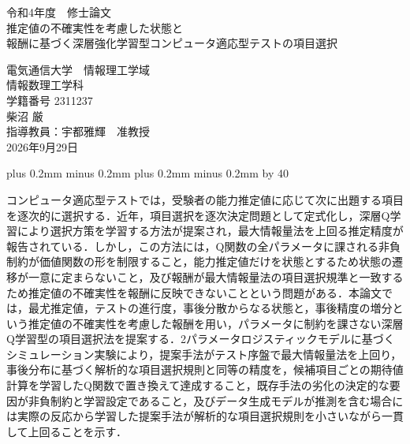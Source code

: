 \documentclass[a4paper,12pt,oneside,openany]{jsbook}
\def\kcharparline#1{%
   \ifx\xkanjiskip\undefined%
   \jintercharskip 0mm plus 0.2mm minus 0.2mm
   \else
   \xkanjiskip 0mm plus 0.2mm minus 0.2mm
   \fi
   \settowidth{\textwidth}{}%
   \multiply\textwidth by #1}
\begin{document}
\begin{titlepage}

\begin{center}
{\Large 令和4年度　修士論文}\\ %
\vspace*{120truept}
{\LARGE 推定値の不確実性を考慮した状態と}\\ %
{\LARGE 報酬に基づく深層強化学習型コンピュータ適応型テストの項目選択}\\ %
\vspace{100truept}

{\LARGE 電気通信大学　情報理工学域}\\ %
\vspace{10truept}
{\LARGE 情報数理工学科}\\ %
\vspace{10truept}
{\LARGE 学籍番号 2311237}\\ %
\vspace{50truept}
{\LARGE 柴沼 厳}\\ %
\vspace{50truept}
{\LARGE 指導教員：宇都雅輝　准教授}\\
\vspace{50truept}
{\LARGE 2026年9月29日}\\ %
\end{center}
\end{titlepage}
\kcharparline{40} %

\frontmatter

コンピュータ適応型テストでは，受験者の能力推定値に応じて次に出題する項目を逐次的に選択する．近年，項目選択を逐次決定問題として定式化し，深層Q学習により選択方策を学習する方法が提案され，最大情報量法を上回る推定精度が報告されている．しかし，この方法には，Q関数の全パラメータに課される非負制約が価値関数の形を制限すること，能力推定値だけを状態とするため状態の遷移が一意に定まらないこと，及び報酬が最大情報量法の項目選択規準と一致するため推定値の不確実性を報酬に反映できないことという問題がある．本論文では，最尤推定値，テストの進行度，事後分散からなる状態と，事後精度の増分という推定値の不確実性を考慮した報酬を用い，パラメータに制約を課さない深層Q学習型の項目選択法を提案する．2パラメータロジスティックモデルに基づくシミュレーション実験により，提案手法がテスト序盤で最大情報量法を上回り，事後分布に基づく解析的な項目選択規則と同等の精度を，候補項目ごとの期待値計算を学習したQ関数で置き換えて達成すること，既存手法の劣化の決定的な要因が非負制約と学習設定であること，及びデータ生成モデルが推測を含む場合には実際の反応から学習した提案手法が解析的な項目選択規則を小さいながら一貫して上回ることを示す．
\end{document}

